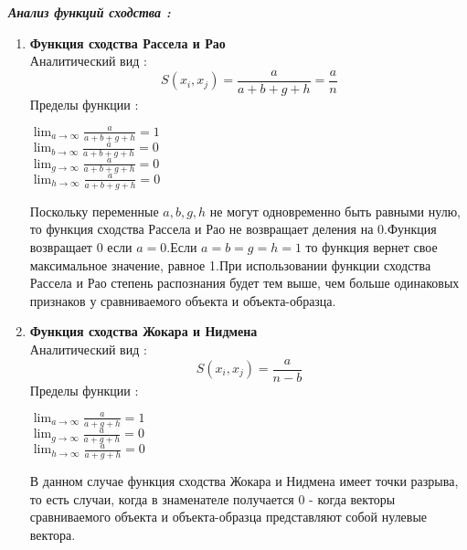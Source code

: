 \documentclass[a4paper,12pt]{article}
\begin{document}
	\begin{flushleft}
 		\textit{\textbf{Анализ функций сходства :}}
 		\\
 			\hangindent=1.5cm  \noindent
			\begin{enumerate}
				\item \textbf{Функция сходства Рассела и Рао}
				\\ Аналитический вид :
					\begin{equation}
						S(x_i,x_j) = \frac{a}{a+b+g+h} = \frac{a}{n}
					\end{equation}
					Пределы функции :
					\\
					\medskip
					\begin{center}
						${\lim_{a\to \infty} \frac{a}{a+b+g+h}=1}$
						\\					
						\medskip						
						${\lim_{b\to \infty} \frac{a}{a+b+g+h}=0}$
						\\
						\medskip						
						${\lim_{g\to \infty} \frac{a}{a+b+g+h}=0}$
						\\
						\medskip						
						${\lim_{h\to \infty} \frac{a}{a+b+g+h}=0}$					
					\end{center}
					Поскольку переменные ${a,b,g,h}$ не могут одновременно быть 	равными нулю, то функция сходства Рассела и Рао не возвращает деления на 0.Функция возвращает 0 если ${a = 0}$.Если ${a=b=g=h=1}$ то функция вернет свое максимальное значение, равное 1.При использовании функции сходства Рассела и Рао степень распознания будет тем выше, чем больше одинаковых признаков у сравниваемого объекта и объекта-образца.
			\item \textbf{Функция сходства Жокара и Нидмена}
				\\ Аналитический вид :
					\begin{equation}
						S(x_i,x_j) = \frac{a}{n-b} 
					\end{equation}
					Пределы функции :
					\begin{center}
						${\lim_{a\to \infty} \frac{a}{a+g+h}=1}$
						\\					
						\medskip						
						${\lim_{g\to \infty} \frac{a}{a+g+h}=0}$
						\\
						\medskip						
						${\lim_{h\to \infty} \frac{a}{a+g+h}=0}$
						\\
						\medskip						
					\end{center}					
					В данном случае функция сходства Жокара и Нидмена имеет точки 	разрыва, то есть случаи, когда в знаменателе получается 0  - когда векторы 	сравниваемого объекта и объекта-образца представляют собой нулевые вектора.

\end{enumerate}
\end{flushleft}
\end{document}
